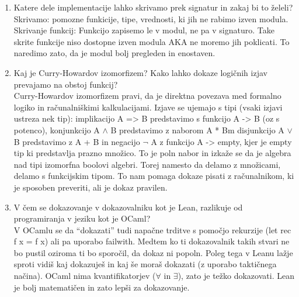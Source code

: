 \documentclass[a4paper]{article}
\begin{document}
\begin{enumerate}
        \textbf{Signatura} je tip modula, ki ga definira.
        Oblika: module type IME = sig\\
            type t\\
            val a : int\\
            val b : int\\
        end\\
        Uporaba signature: preverja tipe modulov in da so v modulih vse funkcije definirane. Koristno, da imas napisano, katrere stvari moras se implemetirati. Tako se lahko stvari lažje popravljajo in skrivamo stvari

        \item Katere dele implementacije lahko skrivamo prek signatur in zakaj bi to želeli?\\ 
        Skrivamo: pomozne funkicije, tipe, vrednosti, ki jih ne rabimo izven modula.\\
        Skrivanje funkcij: Funkcijo zapisemo le v modul, ne pa v signaturo. Take skrite funkcije niso dostopne izven modula AKA ne moremo jih poklicati. To naredimo zato, da je modul bolj pregleden in enostaven.
    
        \item Kaj je Curry-Howardov izomorfizem? Kako lahko dokaze logičnih izjav prevajamo na obstoj funkcij?\\
        Curry-Howardov izomorfizem pravi, da je direktna povezava med formalno logiko in računalniškimi kalkulacijami. Izjave se ujemajo s tipi (vsaki izjavi ustreza nek tip): implikacijo A => B predstavimo s funkcijo A -> B (oz s potenco), konjunkcijo A $\land$ B predstavimo z naborom A * Bm disjunkcijo A $\lor$ B predstavimo z A + B in negacijo $\lnot$ A z funkcijo A -> empty, kjer je empty tip ki predstavlja prazno množico. To je poln nabor in izkaže se da je algebra nad tipi izomorfna boolovi algebri. Torej namesto da delamo z množicami, delamo s funkcijskim tipom. To nam pomaga dokaze pisati z računalnikom, ki je sposoben preveriti, ali je dokaz pravilen.
    
        \item V čem se dokazovanje v dokazovalniku kot je Lean, razlikuje od programiranja v jeziku kot je OCaml?\\
        V OCamlu se da “dokazati” tudi napačne trditve s pomočjo rekurzije (let rec f x = f x) ali pa uporabo failwith. Medtem ko ti dokazovalnik takih stvari ne bo pustil oziroma ti bo sporočil, da dokaz ni popoln. Poleg tega v Leanu lažje sproti vidiš kaj dokazuješ in kaj še moraš dokazati (z uporabo taktičnega načina). OCaml nima kvantifikatorjev ($\forall$ in $\exists$), zato je težko dokazovati. Lean je bolj matematičen in zato lepši za dokazovanje.
    

\end{enumerate}
\end{document}
